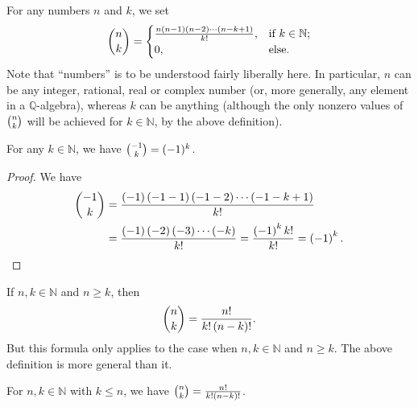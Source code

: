 \begin{definition}
\label{def.binom.binom}
\leantarget
\leanok
For any numbers $n$ and $k$, we set%
\begin{equation}
\dbinom{n}{k}=%
\begin{cases}
\dfrac{n\left(  n-1\right)  \left(  n-2\right)  \cdots\left(  n-k+1\right)
}{k!}, & \text{if }k\in\mathbb{N};\\
0, & \text{else.}%
\end{cases}
\label{eq.def.binom.binom.eq}%
\end{equation}
Note that ``numbers'' is to be understood
fairly liberally here. In particular, $n$ can be any integer, rational, real
or complex number (or, more generally, any element in a $\mathbb{Q}$-algebra),
whereas $k$ can be anything (although the only nonzero values of $\dbinom
{n}{k}$ will be achieved for $k\in\mathbb{N}$, by the above definition).
\end{definition}

\begin{lemma}
\label{lem.binom.neg_one}
\leanhelper
\leanok
For any $k\in\mathbb{N}$, we have
$\dbinom{-1}{k} = (-1)^k$.
\end{lemma}

\begin{proof}
\leanok
We have
\begin{align*}
\dbinom{-1}{k}  &  =\dfrac{\left(  -1\right)  \left(  -1-1\right)  \left(
-1-2\right)  \cdots\left(  -1-k+1\right)  }{k!}\\
&  =\dfrac{\left(  -1\right)  \left(  -2\right)  \left(  -3\right)
\cdots\left(  -k\right)  }{k!}=\dfrac{\left(  -1\right)  ^{k}k!}{k!}=\left(
-1\right)  ^{k}.
\end{align*}
\end{proof}

If $n,k\in\mathbb{N}$ and $n\geq k$, then
\begin{equation}
\dbinom{n}{k}=\dfrac{n!}{k!\left(  n-k\right)  !}. \label{eq.binom.fac-form}%
\end{equation}
But this formula only applies to the case when $n,k\in\mathbb{N}$ and $n\geq
k$. The above definition is more general than it.

\begin{lemma}
\label{lem.binom.fac-form}
\leanhelper
\leanok
For $n,k\in\mathbb{N}$ with $k \leq n$, we have
$\dbinom{n}{k}=\dfrac{n!}{k!\left(  n-k\right)  !}$.
\end{lemma}

